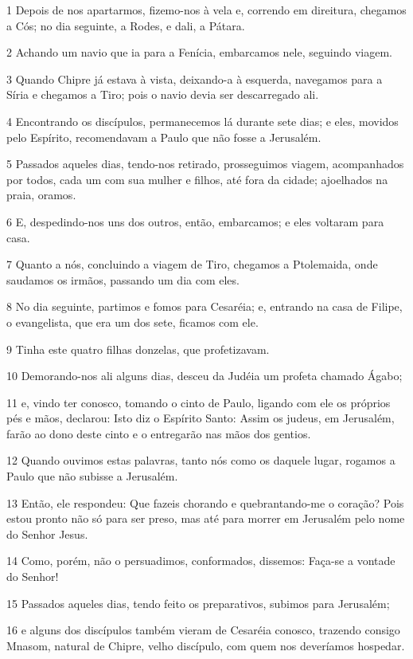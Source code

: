 \par 1 Depois de nos apartarmos, fizemo-nos à vela e, correndo em direitura, chegamos a Cós; no dia seguinte, a Rodes, e dali, a Pátara.
\par 2 Achando um navio que ia para a Fenícia, embarcamos nele, seguindo viagem.
\par 3 Quando Chipre já estava à vista, deixando-a à esquerda, navegamos para a Síria e chegamos a Tiro; pois o navio devia ser descarregado ali.
\par 4 Encontrando os discípulos, permanecemos lá durante sete dias; e eles, movidos pelo Espírito, recomendavam a Paulo que não fosse a Jerusalém.
\par 5 Passados aqueles dias, tendo-nos retirado, prosseguimos viagem, acompanhados por todos, cada um com sua mulher e filhos, até fora da cidade; ajoelhados na praia, oramos.
\par 6 E, despedindo-nos uns dos outros, então, embarcamos; e eles voltaram para casa.
\par 7 Quanto a nós, concluindo a viagem de Tiro, chegamos a Ptolemaida, onde saudamos os irmãos, passando um dia com eles.
\par 8 No dia seguinte, partimos e fomos para Cesaréia; e, entrando na casa de Filipe, o evangelista, que era um dos sete, ficamos com ele.
\par 9 Tinha este quatro filhas donzelas, que profetizavam.
\par 10 Demorando-nos ali alguns dias, desceu da Judéia um profeta chamado Ágabo;
\par 11 e, vindo ter conosco, tomando o cinto de Paulo, ligando com ele os próprios pés e mãos, declarou: Isto diz o Espírito Santo: Assim os judeus, em Jerusalém, farão ao dono deste cinto e o entregarão nas mãos dos gentios.
\par 12 Quando ouvimos estas palavras, tanto nós como os daquele lugar, rogamos a Paulo que não subisse a Jerusalém.
\par 13 Então, ele respondeu: Que fazeis chorando e quebrantando-me o coração? Pois estou pronto não só para ser preso, mas até para morrer em Jerusalém pelo nome do Senhor Jesus.
\par 14 Como, porém, não o persuadimos, conformados, dissemos: Faça-se a vontade do Senhor!
\par 15 Passados aqueles dias, tendo feito os preparativos, subimos para Jerusalém;
\par 16 e alguns dos discípulos também vieram de Cesaréia conosco, trazendo consigo Mnasom, natural de Chipre, velho discípulo, com quem nos deveríamos hospedar.
